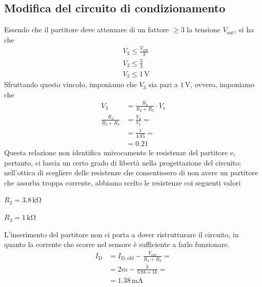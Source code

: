 \documentclass[a4paper]{article}
\begin{document}
		\subsection{Modifica del circuito di condizionamento}
			Essendo che il partitore deve attenuare di un fattore $ \ge 3 $ la tensione $ V_{\mathrm{out}} $, si ha che
			\begin{equation*}
				\begin{split}
					&V_{3} \le \frac{V_{\mathrm{out}}}{3} \\
					&V_{3} \le \frac{3}{3} \\
					&V_{3} \le 1 \, \mathrm{V}
				\end{split}
			\end{equation*}
			Sfruttando questo vincolo, imponiamo che $ V_{3} $ sia pari a $ 1 \, \mathrm{V} $, ovvero, imponiamo che
			\begin{equation*}
				\begin{split}
					V_{3} &= \frac{R_{3}}{R_{2} + R_{3}} \cdot V_{\mathrm{s}} \\
					\frac{R_{3}}{R_{2} + R_{3}} &= \frac{V_{3}}{V_{\mathrm{s}}} = \\
												&= \frac{1}{4.85} = \\
												&= 0.21
				\end{split}
			\end{equation*}
			Questa relazione non identifica univocamente le resistenze del partitore e, pertanto, ci lascia un certo grado di libertà nella progettazione del circuito; nell'ottica di scegliere delle resistenze che consentissero di non avere un partitore che assorba troppa corrente, abbiamo scelto le resistenze coi seguenti valori
			\begin{center}
				$ R_{2} = 3.8 \, \mathrm{k\Omega} $
			\end{center}
			\begin{center}
				$ R_{3} = 1 \, \mathrm{k\Omega} $
			\end{center}
			L'inserimento del partitore non ci porta a dover ristrutturare il circuito, in quanto la corrente che scorre nel sensore è sufficiente a farlo funzionare.
			\begin{equation*}
				\begin{split}
					I_{\mathrm{D}} &= I_{\mathrm{D, old}} - \frac{V_{\mathrm{out}}}{R_{2} + R_{3}} = \\
						  &= 2m - \frac{3}{3.8k + 1k} = \\
						  &= 1.38 \, \mathrm{mA}
				\end{split}
			\end{equation*}
\end{document}
